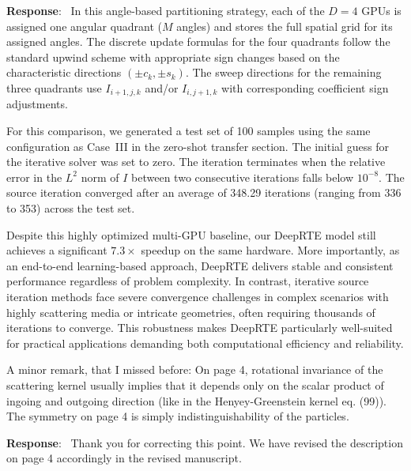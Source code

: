 \documentclass[12pt]{article}
\newcounter{reviewer}
\newcounter{point}[reviewer]
\renewcommand{\thepoint}{P\,\thereviewer.\arabic{point}}
\newenvironment{point}{\refstepcounter{point} \bigskip \noindent {\textbf{[Reviewer~Point~\thepoint]} }  }{\par }
\newenvironment{reply}{\medskip \noindent \textbf{Response}:\  \color{blue}\ignorespaces}{\medskip}
\begin{document}
\begin{reply}
	In this angle-based partitioning strategy, each of the $D=4$ GPUs is assigned one angular quadrant ($M$ angles) and stores the full spatial grid for its assigned angles. The discrete update formulas for the four quadrants follow the standard upwind scheme with appropriate sign changes based on the characteristic directions $(\pm c_k, \pm s_k)$. The sweep directions for the remaining three quadrants use $I_{i+1,j,k}$ and/or $I_{i,j+1,k}$ with corresponding coefficient sign adjustments.

	For this comparison, we generated a test set of 100 samples using the same configuration as Case~III in the zero-shot transfer section. The initial guess for the iterative solver was set to zero. The iteration terminates when the relative error in the $L^2$ norm of \(I\) between two consecutive iterations falls below \(10^{-8}\). The source iteration converged after an average of 348.29 iterations (ranging from 336 to 353) across the test set.

	Despite this highly optimized multi-GPU baseline, our DeepRTE model still achieves a significant $7.3\times$ speedup on the same hardware.
	More importantly, as an end-to-end learning-based approach, DeepRTE delivers stable and consistent performance regardless of problem complexity. In contrast, iterative source iteration methods face severe convergence challenges in complex scenarios with highly scattering media or intricate geometries, often requiring thousands of iterations to converge. This robustness makes DeepRTE particularly well-suited for practical applications demanding both computational efficiency and reliability.




\end{reply}\begin{point}
	A minor remark, that I missed before: On page 4, rotational invariance of the scattering kernel usually implies that it depends only on the scalar product of ingoing and outgoing direction (like in the Henyey-Greenstein kernel eq. (99)). The symmetry on page 4 is simply indistinguishability of the particles.
\end{point}

\begin{reply}
	Thank you for correcting this point. We have revised the description on page 4 accordingly in the revised manuscript.
\end{reply}
\end{document}

